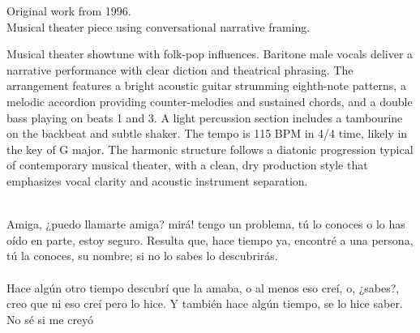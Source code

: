 

\begin{notes}
Original work from 1996.\\
Musical theater piece using conversational narrative framing.
\end{notes}

\begin{style}
Musical theater showtune with folk-pop influences. %
Baritone male vocals deliver a narrative performance with clear diction and theatrical phrasing. %
The arrangement features a bright acoustic guitar strumming eighth-note patterns, a melodic accordion providing counter-melodies and sustained chords, and a double bass playing on beats 1 and 3. %
A light percussion section includes a tambourine on the backbeat and subtle shaker. %
The tempo is 115 BPM in 4/4 time, likely in the key of G major. %
The harmonic structure follows a diatonic progression typical of contemporary musical theater, with a clean, dry production style that emphasizes vocal clarity and acoustic instrument separation.
\end{style}

\begin{lyrics}

\\
Amiga, ¿puedo llamarte amiga? mirá! tengo un problema, tú lo conoces o lo has oído en parte, estoy seguro. %
Resulta que, hace tiempo ya, encontré a una persona, tú la conoces, su nombre; si no lo sabes lo descubrirás.\\
\\
Hace algún otro tiempo descubrí que la amaba, o al menos eso creí, o, ¿sabes?, creo que ni eso creí pero lo hice. %
Y también hace algún tiempo, se lo hice saber. %
No sé si me creyó 

\end{lyrics}

